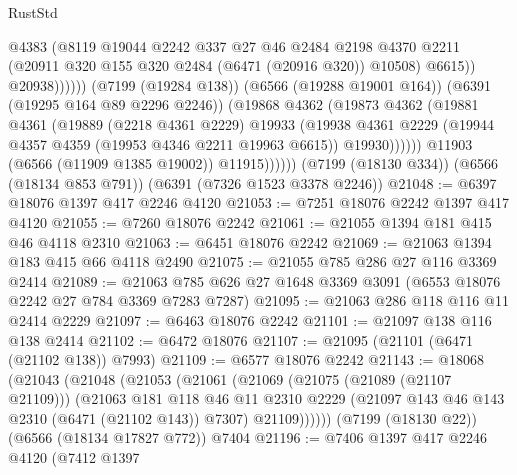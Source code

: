 \begin{lexlean}{RustStd}
\begin{coremodule}
{\begin{coremodule}
{{{{{{{{{{{{{{{{{{{{{{{{{{                                @4383
                                (@8119
                                  @19044
                                  @2242
                                  @337
                                  @27
                                  @46
                                  @2484
                                  @2198
                                  @4370
                                  @2211
                                  (@20911 @320 @155 @320 @2484 (@6471 (@20916 @320)) @10508)
                                  @6615))
                              @20938))))))
                  (@7199 (@19284 @138))
                  (@6566 (@19288 @19001 @164))
                  (@6391 (@19295 @164 @89 @2296 @2246))
                  (@19868
                    @4362
                    (@19873
                      @4362
                      (@19881
                        @4361
                        (@19889
                          (@2218 @4361 @2229)
                          @19933
                          (@19938
                            @4361
                            @2229
                            (@19944 @4357 @4359 (@19953 @4346 @2211 @19963 @6615))
                            @19930))))))
                @11903
                (@6566 (@11909 @1385 @19002))
                @11915))))))
    (@7199 (@18130 @334))
    (@6566 (@18134 @853 @791))
    (@6391 (@7326 @1523 @3378 @2246))
@21048 := @6397 @18076 @1397 @417 @2246 @4120
@21053 := @7251 @18076 @2242 @1397 @417 @4120
@21055 := @7260 @18076 @2242
@21061 := @21055 @1394 @181 @415 @46 @4118 @2310
@21063 := @6451 @18076 @2242
@21069 := @21063 @1394 @183 @415 @66 @4118 @2490
@21075 := @21055 @785 @286 @27 @116 @3369 @2414
@21089 := @21063 @785 @626 @27 @1648 @3369 @3091 (@6553 @18076 @2242 @27 @784 @3369 @7283 @7287)
@21095 := @21063 @286 @118 @116 @11 @2414 @2229
@21097 := @6463 @18076 @2242
@21101 := @21097 @138 @116 @138 @2414
@21102 := @6472 @18076
@21107 := @21095 (@21101 (@6471 (@21102 @138)) @7993)
@21109 := @6577 @18076 @2242
@21143 := @18068
    (@21043
      (@21048
        (@21053
          (@21061
            (@21069
              (@21075 (@21089 (@21107 @21109)))
              (@21063
                @181
                @118
                @46
                @11
                @2310
                @2229
                (@21097 @143 @46 @143 @2310 (@6471 (@21102 @143)) @7307)
                @21109))))))
    (@7199 (@18130 @22))
    (@6566 (@18134 @17827 @772))
    @7404
@21196 := @7406
    @1397
    @417
    @2246
    @4120
    (@7412
      @1397
}}}}}}}}}}}}}}}}}}}}}}}}}}
\end{coremodule}}
\end{coremodule}
\end{lexlean}

